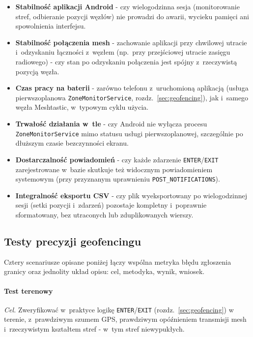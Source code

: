 \begin{itemize}
    \item \textbf{Stabilność aplikacji Android} - czy wielogodzinna sesja (monitorowanie stref,
          odbieranie pozycji węzłów) nie prowadzi do awarii, wycieku pamięci ani spowolnienia
          interfejsu.
    \item \textbf{Stabilność połączenia mesh} - zachowanie aplikacji przy chwilowej utracie
          i~odzyskaniu łączności z~węzłem (np.\ przy przejściowej utracie zasięgu radiowego) - czy
          stan po odzyskaniu połączenia jest spójny z~rzeczywistą pozycją węzła.
    \item \textbf{Czas pracy na baterii} - zarówno telefonu z~uruchomioną aplikacją (usługa
          pierwszoplanowa \texttt{ZoneMonitorService}, rozdz.~\ref{sec:geofencing}), jak i~samego
          węzła Meshtastic, w~typowym cyklu użycia.
    \item \textbf{Trwałość działania w~tle} - czy Android nie wyłącza procesu
          \texttt{ZoneMonitorService} mimo statusu usługi pierwszoplanowej, szczególnie po dłuższym
          czasie bezczynności ekranu.
    \item \textbf{Dostarczalność powiadomień} - czy każde zdarzenie \texttt{ENTER}/\texttt{EXIT}
          zarejestrowane w~bazie skutkuje też widocznym powiadomieniem systemowym (przy przyznanym
          uprawnieniu \texttt{POST\_NOTIFICATIONS}).
    \item \textbf{Integralność eksportu CSV} - czy plik wyeksportowany po wielogodzinnej sesji
          (setki pozycji i~zdarzeń) pozostaje kompletny i~poprawnie sformatowany, bez utraconych lub
          zduplikowanych wierszy.
\end{itemize}

\subsection*{Testy precyzji geofencingu}
\label{sec:precyzja-geofencingu}

Cztery scenariusze opisane poniżej łączy wspólna metryka błędu zgłoszenia granicy oraz
jednolity układ opisu: cel, metodyka, wynik, wniosek.

\paragraph{Test terenowy}

\textit{Cel.} Zweryfikować w~praktyce logikę \texttt{ENTER}/\texttt{EXIT} (rozdz.~\ref{sec:geofencing})
w terenie, z~prawdziwym szumem GPS, prawdziwym opóźnieniem transmisji mesh
i~rzeczywistym kształtem stref - w~tym stref niewypukłych.


